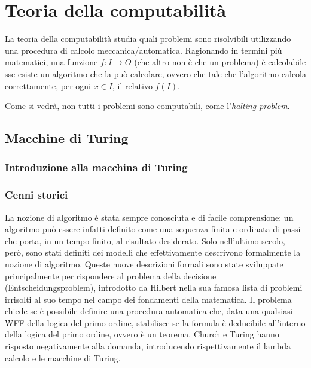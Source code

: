 \chapter{Teoria della computabilità}
La teoria della computabilità studia quali problemi sono risolvibili utilizzando
una procedura di calcolo meccanica/automatica.
Ragionando in termini più matematici, una funzione $f: I \rightarrow O$
(che altro non è che un problema) è calcolabile sse esiste un algoritmo
che la può calcolare, ovvero che tale che l'algoritmo calcola correttamente,
per ogni $x \in I$, il relativo $f(I)$.

Come si vedrà, non tutti i problemi sono computabili, come l'\textit{halting problem}.

\section{Macchine di Turing}
\subsection{Introduzione alla macchina di Turing}
\subsection*{Cenni storici}
La nozione di algoritmo è stata sempre conosciuta e di facile comprensione:
un algoritmo può essere infatti definito come una sequenza finita e ordinata
di passi che porta, in un tempo finito, al risultato desiderato.
Solo nell'ultimo secolo, però, sono stati definiti dei modelli che
effettivamente descrivono formalmente la nozione di algoritmo.
Queste nuove descrizioni formali sono state sviluppate principalmente per
rispondere al problema della decisione (Entscheidungsproblem), introdotto da
Hilbert nella sua famosa lista di problemi irrisolti al suo tempo nel campo
dei fondamenti della matematica. Il problema chiede se è possibile definire una
procedura automatica che, data una qualsiasi WFF della logica del primo ordine,
stabilisce se la formula è deducibile all'interno della logica del primo ordine,
ovvero è un teorema. Church e Turing hanno risposto negativamente alla domanda,
introducendo rispettivamente il lambda calcolo e le macchine di Turing.

